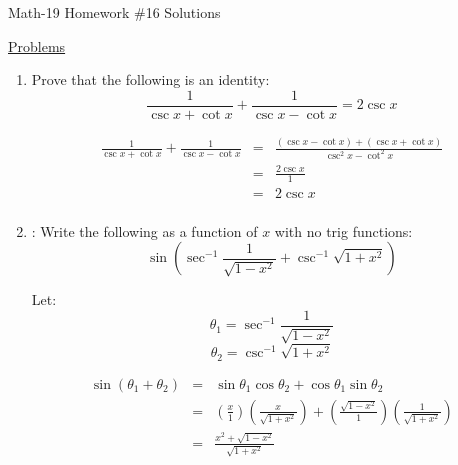 \documentclass[letterpaper,12pt,fleqn]{article}
\renewcommand{\o}{\theta}
\begin{document}
\begin{center}
\Large Math-19 Homework \#16 Solutions
\end{center}

\vspace{0.5in}

\underline{Problems}

\begin{enumerate}
\item Prove that the following is an identity:
  \[\frac{1}{\csc{x}+\cot{x}}+\frac{1}{\csc{x}-\cot{x}}=2\csc{x}\]

  \begin{eqnarray*}
    \frac{1}{\csc{x}+\cot{x}}+\frac{1}{\csc{x}-\cot{x}} &=&
    \frac{(\csc{x}-\cot{x})+(\csc{x}+\cot{x})}{\csc^2x-\cot^2x} \\
    &=& \frac{2\csc{x}}{1} \\
    &=& 2\csc{x} \\
  \end{eqnarray*}

\item: Write the following as a function of $x$ with no trig functions:
  \[\sin\left(\sec^{-1}\frac{1}{\sqrt{1-x^2}}+\csc^{-1}\sqrt{1+x^2}\right)\]

  Let:
  \[\o_1=\sec^{-1}\frac{1}{\sqrt{1-x^2}}\]
  \[\o_2=\csc^{-1}\sqrt{1+x^2}\]

  \begin{minipage}{3in}
  \end{minipage}
  \begin{minipage}{3in}
  \end{minipage}

  \begin{eqnarray*}
    \sin(\o_1+\o_2) &=& \sin\o_1\cos\o_2+\cos\o_1\sin\o_2 \\
    &=& \left(\frac{x}{1}\right)\left(\frac{x}{\sqrt{1+x^2}}\right)+
    \left(\frac{\sqrt{1-x^2}}{1}\right)\left(\frac{1}{\sqrt{1+x^2}}\right) \\
    &=& \frac{x^2+\sqrt{1-x^2}}{\sqrt{1+x^2}} \\
  \end{eqnarray*}


\end{enumerate}
\end{document}
